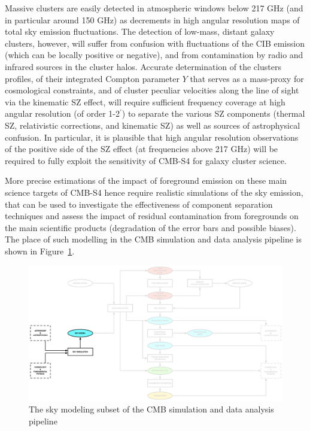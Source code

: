 Massive clusters are easily detected in atmospheric windows below 217 GHz (and in particular around 150 GHz) as decrements in high angular resolution maps of total sky emission fluctuations. The detection of low-mass, distant galaxy clusters, however, will suffer from confusion with fluctuations of the CIB emission (which can be locally positive or negative), and from contamination by radio and infrared sources in the cluster halos. Accurate determination of the clusters profiles, of their integrated Compton parameter $Y$ that serves as a mass-proxy for cosmological constraints, and of cluster peculiar velocities along the line of sight via the kinematic SZ effect, will require sufficient frequency coverage at high angular resolution (of order 1-2$^\prime$) to separate the various SZ components (thermal SZ, relativistic corrections, and kinematic SZ) as well as sources of astrophysical confusion. In particular, it is plausible that high angular resolution observations of the positive side of the SZ effect (at frequencies above 217 GHz) will be required to fully exploit the sensitivity of CMB-S4 for galaxy cluster science.

More precise estimations of the impact of foreground emission on these main science targets of CMB-S4 hence require realistic simulations of the sky emission, that can be used to investigate the effectiveness of component separation techniques and assess the impact of residual contamination from foregrounds on the main scientific products (degradation of the error bars and possible biases). The place of such modelling in the CMB simulation and data analysis pipeline is shown in Figure~\ref{fig:skymodel-in-pipeline}.

\begin{figure}[htbp]
\centering
\includegraphics[width=1\textwidth]{Analysis/sm}
\caption{The sky modeling subset of the CMB simulation and data analysis pipeline}
\label{fig:skymodel-in-pipeline}
\end{figure}

